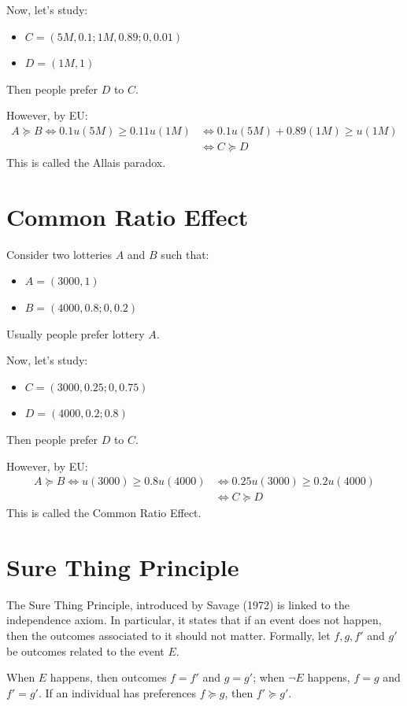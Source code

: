 \documentclass[12pt]{report}
\begin{document}
Now, let's study:\begin{itemize}
\item $C = (5M, 0.1; 1M, 0.89; 0, 0.01)$
\item $D = (1M, 1)$
\end{itemize}
Then people prefer $D$ to $C$.

However, by EU:\begin{align*}
A\succeq B \Leftrightarrow 0.1u(5M) \geq 0.11u(1M) & \Leftrightarrow 0.1u(5M) + 0.89(1M) \geq u(1M) \\ & \Leftrightarrow C\succeq D
\end{align*}
This is called the Allais paradox.

\section{Common Ratio Effect}

Consider two lotteries $A$ and $B$ such that:\begin{itemize}
\item $A = (3000, 1)$
\item $B = (4000, 0.8; 0, 0.2)$
\end{itemize}
Usually people prefer lottery $A$.

Now, let's study:\begin{itemize}
\item $C = (3000, 0.25; 0, 0.75)$
\item $D = (4000, 0.2; 0.8)$
\end{itemize}
Then people prefer $D$ to $C$.

However, by EU:\begin{align*}
A\succeq B \Leftrightarrow u(3000) \geq 0.8u(4000) & \Leftrightarrow 0.25u(3000) \geq 0.2u(4000) \\ & \Leftrightarrow C\succeq D
\end{align*}
This is called the Common Ratio Effect.

\section{Sure Thing Principle}

The Sure Thing Principle, introduced by Savage (1972) is linked to the independence axiom. In particular, it states that if an event does not happen, then the outcomes associated to it should not matter. Formally, let $f, g, f'$ and $g'$ be outcomes related to the event $E$.

When $E$ happens, then outcomes $f = f'$ and $g=g'$; when $\neg E$ happens, $f = g$ and $f' = g'$. If an individual has preferences $f\succeq g$, then $f'\succeq g'$.
\end{document}

